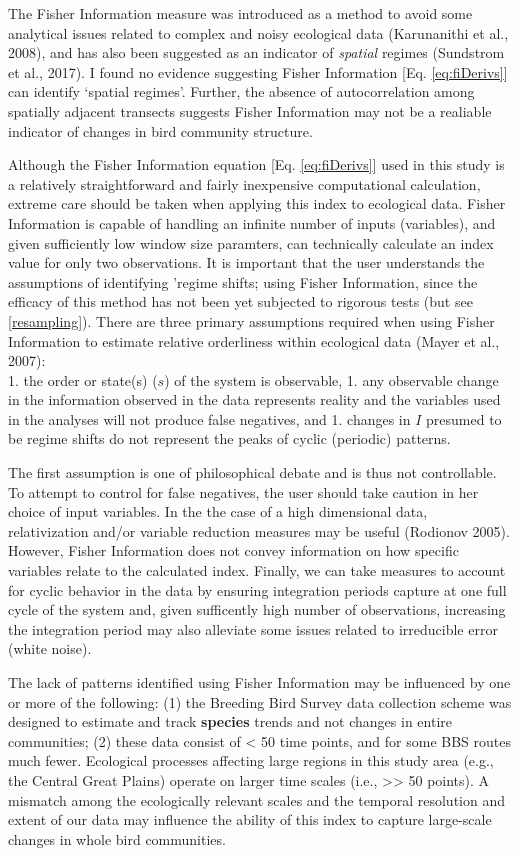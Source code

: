 \documentclass[12pt,twoside,openany]{reedthesis}
\begin{document}
The Fisher Information measure was introduced as a method to avoid some analytical issues related to complex and noisy ecological data (Karunanithi et al., 2008), and has also been suggested as an indicator of \emph{spatial} regimes (Sundstrom et al., 2017). I found no evidence suggesting Fisher Information {[}Eq. \eqref{eq:fiDerivs}{]} can identify `spatial regimes'. Further, the absence of autocorrelation among spatially adjacent transects suggests Fisher Information may not be a realiable indicator of changes in bird community structure.

Although the Fisher Information equation {[}Eq. \eqref{eq:fiDerivs}{]} used in this study is a relatively straightforward and fairly inexpensive computational calculation, extreme care should be taken when applying this index to ecological data. Fisher Information is capable of handling an infinite number of inputs (variables), and given sufficiently low window size paramters, can technically calculate an index value for only two observations. It is important that the user understands the assumptions of identifying 'regime shifts; using Fisher Information, since the efficacy of this method has not been yet subjected to rigorous tests (but see \ref{resampling}). There are three primary assumptions required when using Fisher Information to estimate relative orderliness within ecological data (Mayer et al., 2007):\\
1. the order or state(s) (\(s\)) of the system is observable,
1. any observable change in the information observed in the data represents reality and the variables used in the analyses will not produce false negatives, and
1. changes in \(I\) presumed to be regime shifts do not represent the peaks of cyclic (periodic) patterns.

The first assumption is one of philosophical debate and is thus not controllable. To attempt to control for false negatives, the user should take caution in her choice of input variables. In the the case of a high dimensional data, relativization and/or variable reduction measures may be useful (Rodionov 2005). However, Fisher Information does not convey information on how specific variables relate to the calculated index. Finally, we can take measures to account for cyclic behavior in the data by ensuring integration periods capture at one full cycle of the system and, given sufficently high number of observations, increasing the integration period may also alleviate some issues related to irreducible error (white noise).

The lack of patterns identified using Fisher Information may be influenced by one or more of the following: (1) the Breeding Bird Survey data collection scheme was designed to estimate and track \textbf{species} trends and not changes in entire communities; (2) these data consist of \textless{} 50 time points, and for some BBS routes much fewer. Ecological processes affecting large regions in this study area (e.g., the Central Great Plains) operate on larger time scales (i.e., \textgreater\textgreater{} 50 points). A mismatch among the ecologically relevant scales and the temporal resolution and extent of our data may influence the ability of this index to capture large-scale changes in whole bird communities.
\end{document}
